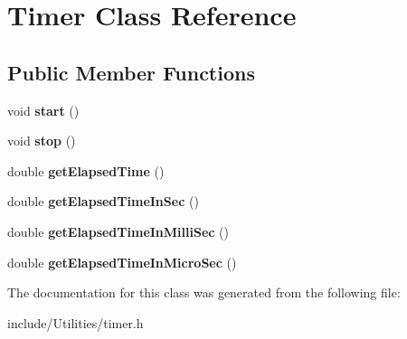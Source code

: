 \hypertarget{class_timer}{
\section{Timer Class Reference}
\label{class_timer}
}
\subsection*{Public Member Functions}
\begin{DoxyCompactItemize}
\item 
\hypertarget{class_timer_a3a8b5272198d029779dc9302a54305a8}{
void {\bfseries start} ()}
\label{class_timer_a3a8b5272198d029779dc9302a54305a8}

\item 
\hypertarget{class_timer_a63f0eb44b27402196590a03781515dba}{
void {\bfseries stop} ()}
\label{class_timer_a63f0eb44b27402196590a03781515dba}

\item 
\hypertarget{class_timer_a71aa716bd43676a5a340eeca5f41cece}{
double {\bfseries getElapsedTime} ()}
\label{class_timer_a71aa716bd43676a5a340eeca5f41cece}

\item 
\hypertarget{class_timer_ac05212f488db392f857660e28a402927}{
double {\bfseries getElapsedTimeInSec} ()}
\label{class_timer_ac05212f488db392f857660e28a402927}

\item 
\hypertarget{class_timer_a71a44ab36290730bc49f8719546194fc}{
double {\bfseries getElapsedTimeInMilliSec} ()}
\label{class_timer_a71a44ab36290730bc49f8719546194fc}

\item 
\hypertarget{class_timer_aeec8f4f81e1b09c6e00ca6744f01af31}{
double {\bfseries getElapsedTimeInMicroSec} ()}
\label{class_timer_aeec8f4f81e1b09c6e00ca6744f01af31}

\end{DoxyCompactItemize}


The documentation for this class was generated from the following file:\begin{DoxyCompactItemize}
\item 
include/Utilities/timer.h\end{DoxyCompactItemize}
